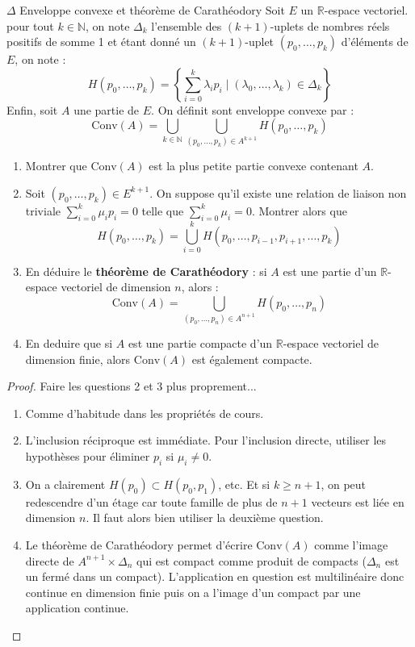 \documentclass[french,a4paper]{article}
\newcommand{\N}{\mathbb{N}}
\newcommand{\R}{\mathbb{R}}
\theoremstyle{plain}
\theoremstyle{definition}
\theoremstyle{remark}
\begin{document}
\begin{ex}{$\Delta$ Enveloppe convexe et théorème de Carathéodory}
	Soit $E$ un $\R$-espace vectoriel. pour tout $k\in\N$, on note $\Delta_k$ l'ensemble des $(k+1)$-uplets de nombres réels positifs de somme 1 et étant donné un $(k+1)$-uplet $(p_0,\ldots,p_k)$ d'éléments de $E$, on note : $$H(p_0,\ldots,p_k)=\left\{\sum_{i=0}^{k}\lambda_ip_i \mid (\lambda_0,\ldots,\lambda_k)\in\Delta_k\right\}$$ Enfin, soit $A$ une partie de $E$. On définit sont enveloppe convexe par : $$\text{Conv}(A)=\bigcup_{k\in\N}\bigcup_{(p_0,\ldots,p_k)\in A^{k+1}}H(p_0,\ldots,p_k)$$
	\begin{enumerate}
		\item Montrer que $\text{Conv}(A)$ est la plus petite partie convexe contenant $A$.
		\item Soit $(p_0,\ldots,p_k)\in E^{k+1}$. On suppose qu'il existe une relation de liaison non triviale $\displaystyle\sum_{i=0}^{k}\mu_ip_i=0$ telle que $\displaystyle\sum_{i=0}^{k}\mu_i=0$. Montrer alors que $$H(p_0,\ldots,p_k)=\bigcup_{i=0}^{k}H(p_0,\ldots,p_{i-1},p_{i+1},\ldots,p_k)$$
		\item En déduire le \textbf{théorème de Carathéodory} : si $A$ est une partie d'un $\R$-espace vectoriel de dimension $n$, alors : $$\text{Conv}(A)=\bigcup_{(p_0,\ldots,p_n)\in A^{n+1}}H(p_0,\ldots,p_n)$$
		\item En deduire que si $A$ est une partie compacte d'un $\R$-espace vectoriel de dimension finie, alors $\text{Conv}(A)$ est également compacte.
	\end{enumerate}
\end{ex}
\begin{proof}
	Faire les questions 2 et 3 plus proprement...
	\begin{enumerate}
		\item Comme d'habitude dans les propriétés de cours.
		\item L'inclusion réciproque est immédiate. Pour l'inclusion directe, utiliser les hypothèses pour éliminer $p_i$ si $\mu_i\ne 0$.
		\item On a clairement $H(p_0)\subset H(p_0,p_1)$, etc. Et si $k\geqslant n+1$, on peut redescendre d'un étage car toute famille de plus de $n+1$ vecteurs est liée en dimension $n$. Il faut alors bien utiliser la deuxième question.
		\item Le théorème de Carathéodory permet d'écrire $\text{Conv}(A)$ comme l'image directe de $A^{n+1}\times\Delta_n$ qui est compact comme produit de compacts ($\Delta_n$ est un fermé dans un compact). L'application en question est multilinéaire donc continue en dimension finie puis on a l'image d'un compact par une application continue.
	\end{enumerate}
\end{proof}
\end{document}
